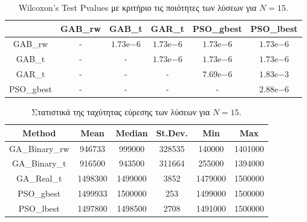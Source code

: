 \documentclass[12pt, a4paper]{article}
\newcommand{\en}{\selectlanguage{english}}
\newcommand{\gr}{\selectlanguage{greek}}
\begin{document}
\begin{table}[H]
	\centering
	\begin{tabular}{| c | c | c | c | c | c |}
		
		\hline
		\en  & \en GAB\_rw & \en GAB\_t & \en GAR\_t & \en PSO\_gbest & \en PSO\_lbest\\
		
		\hline
		\en GAB\_rw & - & $1.73\mathrm{e}{-6}$ & $1.73\mathrm{e}{-6}$ & $1.73\mathrm{e}{-6}$ & $1.73\mathrm{e}{-6}$ \\ 
		
		\hline
		\en GAB\_t & - & - & $1.73\mathrm{e}{-6}$ &  $1.73\mathrm{e}{-6}$ & $1.73\mathrm{e}{-6}$ \\ 
		
		\hline
		\en GAR\_t & - & - & - & $7.69\mathrm{e}{-6}$ & $1.83\mathrm{e}{-3}$ \\ 
		
		\hline
		\en PSO\_gbest & - & - & - & - & $2.88\mathrm{e}{-6}$\\ 
		
		\hline
		
	\end{tabular}
	\caption{\en Wilcoxon's Test Pvalues \gr με κριτήριο τις ποιότητες των λύσεων για $N = 15$.}
	\label{tab:sol_qual_pval_N15}
\end{table}


\begin{table}[H]
	\centering
	\begin{tabular}{| c | c | c | c | c | c |}
		
		\hline
		\en Method & \en Mean & \en Median & \en St.Dev. & \en Min & \en Max \\
		
		\hline
		\en GA\_Binary\_rw & 946733 & 999000 & 328535 & 140000 & 1401000 \\ 
		
		\hline
		\en GA\_Binary\_t & 916500 & 943500 & 311664 & 255000 & 1394000 \\ 
		
		\hline
		\en GA\_Real\_t & 1498300 & 1499000 & 3852 & 1479000 & 1500000 \\ 
		
		\hline
		\en PSO\_gbest & 1499933 & 1500000 & 253 & 1499000 & 1500000\\ 
		
		\hline
		\en PSO\_lbest & 1497800 & 1498500 & 2708 & 1491000 & 1500000 \\ 
		
		\hline
		
	\end{tabular}
	\caption{Στατιστικά της ταχύτητας εύρεσης των λύσεων για $N = 15$.}
	\label{tab:iter_N15}
\end{table}
\end{document}
